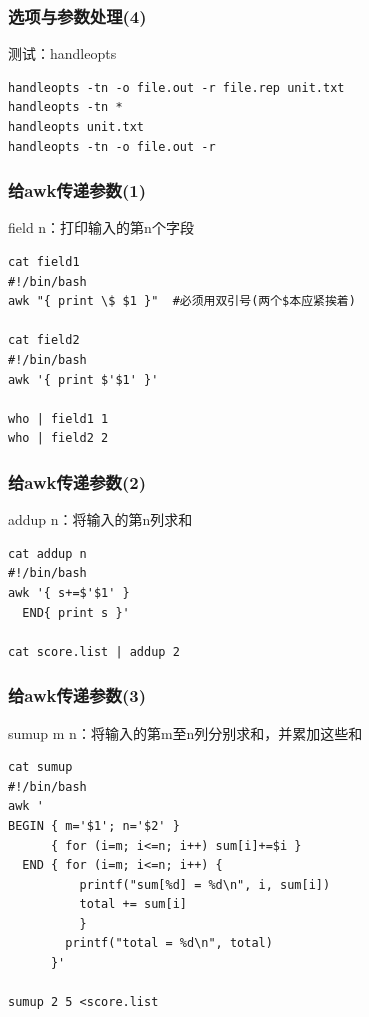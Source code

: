 \documentclass[xcolor=svgnames,presentation]{beamer}
\begin{document}
\begin{frame}[fragile]
\frametitle{选项与参数处理(4)}
\label{sec-1-3-19}
\begin{exampleblock}{测试：handleopts}
\label{sec-1-3-19-1}


\begin{verbatim}
handleopts -tn -o file.out -r file.rep unit.txt
handleopts -tn *
handleopts unit.txt
handleopts -tn -o file.out -r
\end{verbatim}
\end{exampleblock}
\end{frame}
\begin{frame}[fragile]
\frametitle{给awk传递参数(1)}
\label{sec-1-3-20}
\begin{exampleblock}{field n：打印输入的第n个字段}
\label{sec-1-3-20-1}


\begin{verbatim}
cat field1
#!/bin/bash
awk "{ print \$ $1 }"  #必须用双引号(两个$本应紧挨着)

cat field2
#!/bin/bash
awk '{ print $'$1' }'

who | field1 1
who | field2 2
\end{verbatim}
\end{exampleblock}
\end{frame}
\begin{frame}[fragile]
\frametitle{给awk传递参数(2)}
\label{sec-1-3-21}
\begin{block}{addup n：将输入的第n列求和}
\label{sec-1-3-21-1}


\begin{verbatim}
cat addup n
#!/bin/bash
awk '{ s+=$'$1' }
  END{ print s }'

cat score.list | addup 2
\end{verbatim}
\end{block}
\end{frame}
\begin{frame}[fragile]
\frametitle{给awk传递参数(3)}
\label{sec-1-3-22}
\begin{exampleblock}{sumup m n：将输入的第m至n列分别求和，并累加这些和}
\label{sec-1-3-22-1}


\begin{verbatim}
cat sumup
#!/bin/bash
awk '
BEGIN { m='$1'; n='$2' }
      { for (i=m; i<=n; i++) sum[i]+=$i }
  END { for (i=m; i<=n; i++) {
          printf("sum[%d] = %d\n", i, sum[i])
          total += sum[i]
          }
        printf("total = %d\n", total)
      }'

sumup 2 5 <score.list
\end{verbatim}
\end{exampleblock}
\end{frame}
\end{document}
